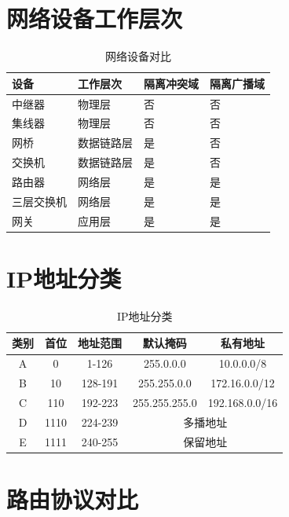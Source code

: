 \section{网络设备工作层次}

\begin{table}[htbp]
\centering
\begin{tabular}{llll}
\toprule
\textbf{设备} & \textbf{工作层次} & \textbf{隔离冲突域} & \textbf{隔离广播域} \\
\midrule
中继器 & 物理层 & 否 & 否 \\
集线器 & 物理层 & 否 & 否 \\
网桥 & 数据链路层 & 是 & 否 \\
交换机 & 数据链路层 & 是 & 否 \\
路由器 & 网络层 & 是 & 是 \\
三层交换机 & 网络层 & 是 & 是 \\
网关 & 应用层 & 是 & 是 \\
\bottomrule
\end{tabular}
\caption{网络设备对比}
\end{table}

\section{IP地址分类}

\begin{table}[htbp]
\centering\small
\begin{tabular}{ccccc}
\toprule
\textbf{类别} & \textbf{首位} & \textbf{地址范围} & \textbf{默认掩码} & \textbf{私有地址} \\
\midrule
A & 0 & 1-126 & 255.0.0.0 & 10.0.0.0/8 \\
B & 10 & 128-191 & 255.255.0.0 & 172.16.0.0/12 \\
C & 110 & 192-223 & 255.255.255.0 & 192.168.0.0/16 \\
D & 1110 & 224-239 & \multicolumn{2}{c}{多播地址} \\
E & 1111 & 240-255 & \multicolumn{2}{c}{保留地址} \\
\bottomrule
\end{tabular}
\caption{IP地址分类}
\end{table}

\section{路由协议对比}

